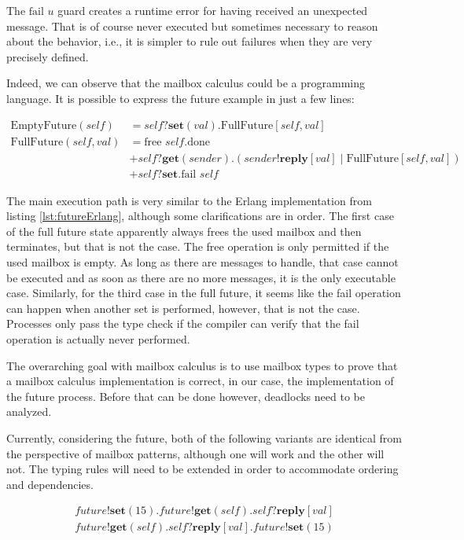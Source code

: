 The $\text{fail }u$ guard creates a runtime error for having received an unexpected message. That is of course never executed but sometimes necessary to reason about the behavior, i.e., it is simpler to rule out failures when they are very precisely defined.

Indeed, we can observe that the mailbox calculus could be a programming language. It is possible to express the future example in just a few lines:

\begin{align*}
    \text{EmptyFuture}(\textit{self}) &= \textit{self}?\textbf{set}(val).\text{FullFuture}[\textit{self}, val] \\
    \text{FullFuture}(\textit{self}, val) &= \text{free }\textit{self}.\text{done} \\
    &+ \textit{self}?\textbf{get}(sender).(sender!\textbf{reply}[val] \mid \text{FullFuture}[\textit{self}, val])\\
    &+\textit{self}?\textbf{set}.\text{fail }\textit{self}
\end{align*}

The main execution path is very similar to the Erlang implementation from listing \ref{lst:futureErlang}, although some clarifications are in order. The first case of the full future state apparently always frees the used mailbox and then terminates, but that is not the case. The free operation is only permitted if the used mailbox is empty. As long as there are messages to handle, that case cannot be executed and as soon as there are no more messages, it is the only executable case. Similarly, for the third case in the full future, it seems like the fail operation can happen when another set is performed, however, that is not the case. Processes only pass the type check if the compiler can verify that the fail operation is actually never performed.

The overarching goal with mailbox calculus is to use mailbox types to prove that a mailbox calculus implementation is correct, in our case, the implementation of the future process. Before that can be done however, deadlocks need to be analyzed.

Currently, considering the future, both of the following variants are identical from the perspective of mailbox patterns, although one will work and the other will not. The typing rules will need to be extended in order to accommodate ordering and dependencies.

\begin{align*}
    \textit{future}!\textbf{set}(15).\textit{future}!\textbf{get}(\textit{self}).\textit{self}?\textbf{reply}[val] \tag{valid use of future}\\
    \textit{future}!\textbf{get}(\textit{self}).\textit{self}?\textbf{reply}[val].\textit{future}!\textbf{set}(15) \tag{invalid use of future}
\end{align*}


